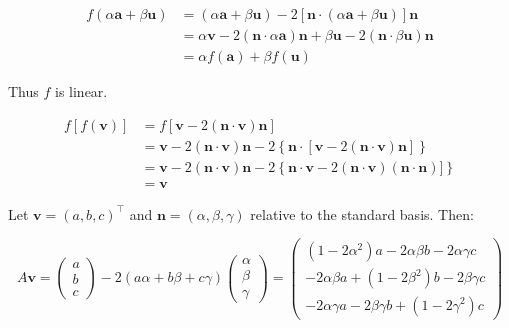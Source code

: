 \documentclass[12pt]{article}
\begin{document}


\begin{equation}
    \begin{split}
        f(\alpha \mathbf{a} + \beta \mathbf{u}) &= (\alpha \mathbf{a} + \beta \mathbf{u}) - 2 \left[ \mathbf{n} \cdot (\alpha \mathbf{a} + \beta \mathbf{u}) \right] \mathbf{n} \\
        &= \alpha \mathbf{v} - 2 \left( \mathbf{n} \cdot \alpha \mathbf{a} \right) \mathbf{n} + \beta \mathbf{u} - 2 \left( \mathbf{n} \cdot \beta \mathbf{u} \right) \mathbf{n} \\
        &= \alpha f(\mathbf{a}) + \beta f(\mathbf{u})
    \end{split}
\end{equation}

Thus $f$ is linear.

\begin{equation}
    \begin{split}
        f[f(\mathbf{v})] &= f[\mathbf{v} - 2(\mathbf{n} \cdot \mathbf{v}) \mathbf{n}] \\
        &= \mathbf{v} - 2(\mathbf{n} \cdot \mathbf{v}) \mathbf{n} - 2 \left\{ \mathbf{n} \cdot [\mathbf{v} - 2(\mathbf{n} \cdot \mathbf{v}) \mathbf{n}] \right\} \\
        &= \mathbf{v} - 2(\mathbf{n} \cdot \mathbf{v}) \mathbf{n} - 2 \left\{ \mathbf{n} \cdot \mathbf{v} - 2(\mathbf{n} \cdot \mathbf{v}) (\mathbf{n} \cdot \mathbf{n})] \right\} \\
        &= \mathbf{v}
    \end{split}
\end{equation}

Let $\mathbf{v} = (a, b, c)^{\intercal}$ and $\mathbf{n} = (\alpha, \beta, \gamma)$ relative to the standard basis. Then:

\begin{equation}
    A \mathbf{v} =
    \begin{pmatrix}
        a \\
        b \\
        c
    \end{pmatrix}
    -
    2 (a\alpha + b\beta + c\gamma)
    \begin{pmatrix}
        \alpha \\
        \beta  \\
        \gamma
    \end{pmatrix}
    =
    \begin{pmatrix}
        (1 - 2\alpha^{2}) a - 2\alpha\beta b - 2\alpha\gamma c \\
        -2\alpha\beta a + (1 - 2\beta^{2}) b - 2\beta\gamma c  \\
        -2\alpha\gamma a - 2\beta\gamma b + (1 - 2\gamma^{2}) c
    \end{pmatrix}
\end{equation}
\end{document}
